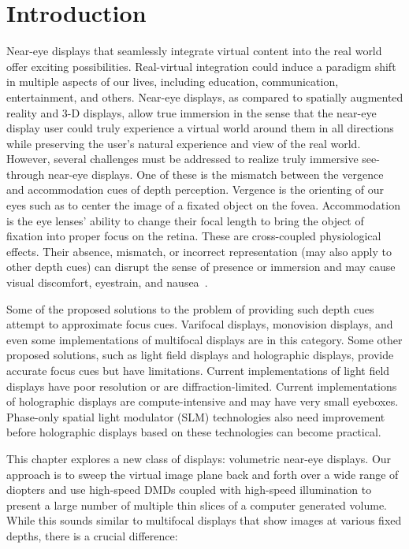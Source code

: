 \section{Introduction}
\label{sec:volumetric:introduction}

Near-eye displays that seamlessly integrate virtual content into the real world offer exciting possibilities. Real-virtual integration could induce a paradigm shift in multiple aspects of our lives, including education, communication, entertainment, and others. Near-eye displays, as compared to spatially augmented reality and 3-D displays, allow true immersion in the sense that the near-eye display user could truly experience a virtual world around them in all directions while preserving the user's natural experience and view of the real world. However, several challenges must be addressed to realize truly immersive see-through near-eye displays. One of these is the mismatch between the vergence and accommodation cues of depth perception. Vergence is the orienting of our eyes such as to center the image of a fixated object on the fovea. Accommodation is the eye lenses' ability to change their focal length to bring the object of fixation into proper focus on the retina. These are cross-coupled physiological effects. Their absence, mismatch, or incorrect representation (may also apply to other depth cues) can disrupt the sense of presence or immersion and may cause visual discomfort, eyestrain, and nausea~\cite{Hoffman2008Vergence}. 

Some of the proposed solutions to the problem of providing such depth cues attempt to approximate focus cues. Varifocal displays, monovision displays, and even some implementations of multifocal displays are in this category. Some other proposed solutions, such as light field displays and holographic displays, provide accurate focus cues but have limitations. Current implementations of light field displays have poor resolution or are diffraction-limited. Current implementations of holographic displays are compute-intensive and may have very small eyeboxes. Phase-only spatial light modulator (SLM) technologies also need improvement before holographic displays based on these technologies can become practical.

This chapter explores a new class of displays: volumetric near-eye displays. Our approach is to sweep the virtual image plane back and forth over a wide range of diopters and use high-speed DMDs coupled with high-speed illumination to present a large number of multiple thin slices of a computer generated volume. While this sounds similar to multifocal displays that show images at various fixed depths, there is a crucial difference:


